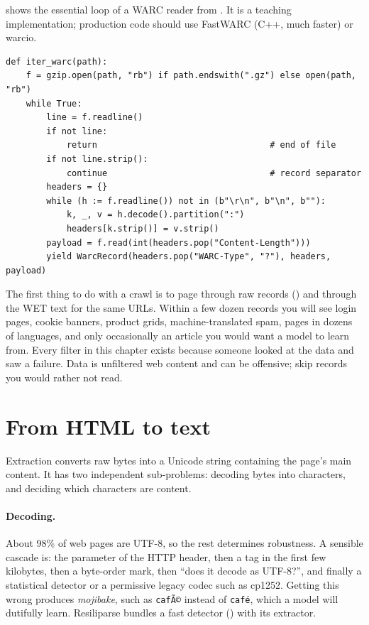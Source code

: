  shows the essential loop of a WARC reader from .
It is a teaching implementation; production code should use FastWARC (C++, much faster) or warcio.

\begin{lstlisting}[caption={Streaming WARC records (from \code{llmsys/datapipe/records.py}).},label={lst:data:warc}]
def iter_warc(path):
    f = gzip.open(path, "rb") if path.endswith(".gz") else open(path, "rb")
    while True:
        line = f.readline()
        if not line:
            return                                  # end of file
        if not line.strip():
            continue                                # record separator
        headers = {}
        while (h := f.readline()) not in (b"\r\n", b"\n", b""):
            k, _, v = h.decode().partition(":")
            headers[k.strip()] = v.strip()
        payload = f.read(int(headers.pop("Content-Length")))
        yield WarcRecord(headers.pop("WARC-Type", "?"), headers, payload)
\end{lstlisting}

\begin{pitfall}
The first thing to do with a crawl is to page through raw records
() and through the WET text for the same URLs. Within a few
dozen records you will see login pages, cookie banners, product grids, machine-translated spam,
pages in dozens of languages, and only occasionally an article you would want a model to learn
from. Every filter in this chapter exists because someone looked at the data and saw a failure.
Data is unfiltered web content and can be offensive; skip records you would rather not read.
\end{pitfall}

\section{From HTML to text}\label{sec:data:extract}

Extraction converts raw bytes into a Unicode string containing the page's main content. It
has two independent sub-problems: decoding bytes into characters, and deciding which characters
are content.

\paragraph{Decoding.} About 98\% of web pages are UTF-8, so the rest determines robustness. A
sensible cascade is: the  parameter of the HTTP  header, then a
 tag in the first few kilobytes, then a byte-order mark, then ``does it
decode as UTF-8?'', and finally a statistical detector or a permissive legacy codec such as
cp1252. Getting this wrong produces \emph{mojibake}, such as \texttt{cafÃ©} instead of \texttt{café}, which a model will dutifully learn. Resiliparse
bundles a fast detector () with its extractor.

